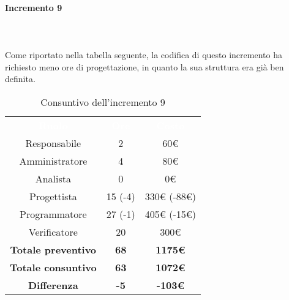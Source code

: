 \paragraph*{Incremento 9} \mbox{} \\ \mbox{} \\
Come riportato nella tabella seguente, la codifica di questo incremento ha richiesto meno ore di progettazione, in quanto la sua struttura era già ben definita. 
\begin{table}[H]
\centering\renewcommand{\arraystretch}{1.5}
\caption{Consuntivo dell'incremento 9}
\vspace{0.2cm}
\begin{tabular}{ c c c }
\rowcolor{redafk}
\textcolor{white}{\textbf{Ruolo}} & \textcolor{white}{\textbf{Ore}} &
\textcolor{white}{\textbf{Costo}}  \\
Responsabile 	& 2 & 60€ \\
Amministratore 	& 4 & 80€ \\
Analista 		&  0 & 0€ \\
Progettista		&  15 (-4) & 330€ (-88€) \\
Programmatore	&  27 (-1) & 405€ (-15€) \\
Verificatore 	&  20 & 300€ \\
\textbf{Totale preventivo} & \textbf{68} & \textbf{1175€}  \\
\textbf{Totale consuntivo} & \textbf{63} & \textbf{1072€}  \\
\rowcolor{lastrowcolor}
\textbf{Differenza} & \textbf{-5} & \textbf{-103€} \\
\end{tabular}
\end{table}

